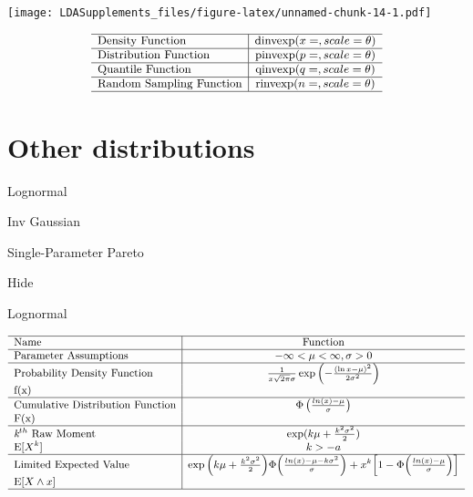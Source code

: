 \documentclass[]{book}
\begin{document}
\texttt{[image: LDASupplements\_files/figure-latex/unnamed-chunk-14-1.pdf]}

\[
{\small
\begin{matrix}
\begin{array}{l|c}
\hline
  \text{Density Function} & \text{dinvexp}(x=, scale=\theta) \\
\hline
  \text{Distribution Function} & \text{pinvexp}(p=, scale=\theta) \\
\hline
  \text{Quantile Function} & \text{qinvexp}(q=, scale=\theta) \\ 
\hline
  \text{Random Sampling Function} & \text{rinvexp}(n=, scale=\theta) \\
\hline
\end{array}
\end{matrix}
}
\]

\section{Other distributions}\label{other-distributions}

Lognormal

Inv Gaussian

Single-Parameter Pareto

\hypertarget{odA}{}
{Hide}

Lognormal

\[
{\small
\begin{matrix}
\begin{array}{l|c}
\hline
  \text{Name} & \text{Function} \\
\hline
  \text{Parameter Assumptions} & -\infty <\mu <\infty, \sigma>0 \\
\hline
  \text{Probability Density Function} & \frac{1}{x\sqrt{2\pi}\sigma} \exp\left( -\frac{(\ln x-\mu)^2}{2\sigma^2}\right) \\
    \text{f(x)} & \\
\hline
  \text{Cumulative Distribution Function} & \Phi\left(\frac{ln(x)-\mu}{\sigma}\right) \\
    \text{F(x)} & \\
\hline
  \textit{k}^{th}~\text{Raw Moment} & \exp(k\mu+\frac{k^2\sigma^2}{2}) \\
  \mathrm{E}[X^k]  & k>-a \\
\hline
  \text{Limited Expected Value} & \exp\Big(k\mu+\frac{k^2\sigma^2}{2}\Big)\Phi\Big(\frac{ln(x)-\mu-k\sigma^2}{\sigma}\Big)+x^k\Big[1-\Phi\Big(\frac{ln(x)-\mu}{\sigma}\Big)\Big]  \\
  \mathrm{E}[X\wedge x] & \\
\hline
\end{array}
\end{matrix}
}
\]
\end{document}
